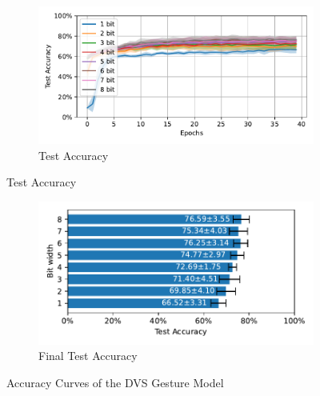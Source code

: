         \begin{figure}[H]
            \centering
            \ContinuedFloat
            \begin{subfigure}[H]{\textwidth}
                \centering
                \includegraphics[width=\textwidth]{../standard/DVSGesture/plots/dvsgesture_test_acc.pdf}
                \caption{Test Accuracy}
            \end{subfigure}
        \end{figure}
        \begin{figure}[H]
            \centering
            \ContinuedFloat
            \begin{subfigure}[H]{\textwidth}
                \centering
                \includegraphics[width=\textwidth]{../standard/DVSGesture/plots/dvsgesture_final_acc_horizontal.pdf}
                \caption{Final Test Accuracy}
            \end{subfigure}
            \caption{Accuracy Curves of the DVS Gesture Model}
        \end{figure}


